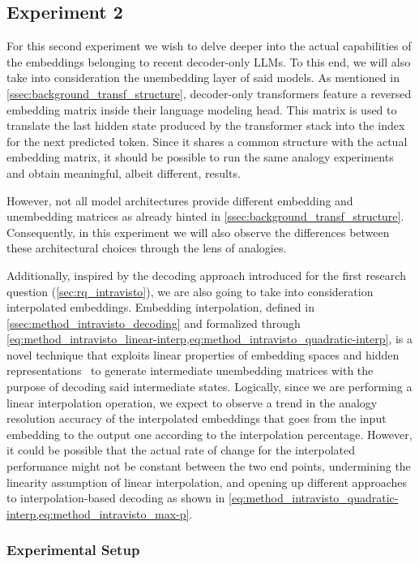 \subsection{Experiment 2}\label{ssec:exp_emb_exp2}

For this second experiment we wish to delve deeper into the actual capabilities of the embeddings belonging to recent decoder-only LLMs.
To this end, we will also take into consideration the unembedding layer of said models.
As mentioned in \cref{ssec:background_transf_structure}, decoder-only transformers feature a reversed embedding matrix inside their language modeling head.
This matrix is used to translate the last hidden state produced by the transformer stack into the index for the next predicted token.
Since it shares a common structure with the actual embedding matrix, it should be possible to run the same analogy experiments and obtain meaningful, albeit different, results.

However, not all model architectures provide different embedding and unembedding matrices as already hinted in \cref{ssec:background_transf_structure}.
Consequently, in this experiment we will also observe the differences between these architectural choices through the lens of analogies.

Additionally, inspired by the decoding approach introduced for the first research question (\cref{sec:rq_intravisto}), we are also going to take into consideration interpolated embeddings.
Embedding interpolation, defined in \cref{ssec:method_intravisto_decoding} and formalized through \cref{eq:method_intravisto_linear-interp,eq:method_intravisto_quadratic-interp}, is a novel technique that exploits linear properties of embedding spaces and hidden representations~\cite{park2023, mikolov2013, drozd2016} to generate intermediate unembedding matrices with the purpose of decoding said intermediate states.
Logically, since we are performing a linear interpolation operation, we expect to observe a trend in the analogy resolution accuracy of the interpolated embeddings that goes from the input embedding to the output one according to the interpolation percentage.
However, it could be possible that the actual rate of change for the interpolated performance might not be constant between the two end points, undermining the linearity assumption of linear interpolation, and opening up different approaches to interpolation-based decoding as shown in \cref{eq:method_intravisto_quadratic-interp,eq:method_intravisto_max-p}.

\subsubsection{Experimental Setup}\label{sssec:exp_emb_exp2_expset}

